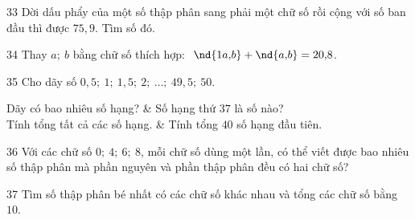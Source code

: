 \gap
\begin{probbox}{33}{}
Dời dấu phẩy của một số thập phân sang phải một chữ số rồi cộng với số ban đầu thì được $75{,}9$. Tìm số đó.
\end{probbox}
\gap
\begin{probbox}{34}{}
Thay $a;\ b$ bằng chữ số thích hợp: $\ \nd{1a{,}b}+\nd{a{,}b}=20{,}8$.
\end{probbox}
\gap
\begin{probbox}{35}{}
Cho dãy số $0{,}5;\ 1;\ 1{,}5;\ 2;\ \dots;\ 49{,}5;\ 50$.
\begin{cols2}
 Dãy có bao nhiêu số hạng? &  Số hạng thứ $37$ là số nào?\\
 Tính tổng tất cả các số hạng. &  Tính tổng $40$ số hạng đầu tiên.
\end{cols2}
\end{probbox}
\gap
\begin{probbox}{36}{}
Với các chữ số $0;\ 4;\ 6;\ 8$, mỗi chữ số dùng một lần, có thể viết được bao nhiêu số thập phân mà phần nguyên và phần thập phân đều có hai chữ số?
\end{probbox}
\gap
\begin{probbox}{37}{}
Tìm số thập phân bé nhất có các chữ số khác nhau và tổng các chữ số bằng $10$.
\end{probbox}

